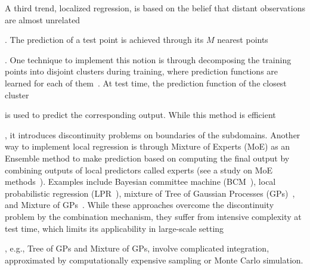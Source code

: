  A third trend, localized regression, is based on the belief that distant observations are almost unrelated. The prediction of a test point is achieved through its $M$ nearest points. One technique to implement this notion is through decomposing the training points into disjoint clusters during training, where prediction functions are learned for  each of them~\cite{park11}. At test time, the prediction function of the closest
cluster is used to predict the corresponding output. While this method is efficient, it introduces discontinuity problems on boundaries of the subdomains. Another way to implement local regression is through Mixture of Experts (MoE) as an Ensemble method to make prediction based on computing the final output by combining outputs of local predictors called experts (see a study on MoE methods~\cite{tymoe12}). Examples include Bayesian committee
machine (BCM~\cite{BCM00}), local probabilistic regression (LPR~\cite{LPR08}), mixture of Tree of Gaussian Processes (GPs)~\cite{TreeGPs07}, and
Mixture of GPs~\cite{Rasmussen:2005}. While these approaches overcome the discontinuity problem by the combination mechanism, they suffer from intensive complexity at test time, which limits its applicability in large-scale setting, e.g., Tree of GPs and Mixture of GPs, involve complicated integration, approximated by computationally expensive sampling or Monte Carlo simulation. 


